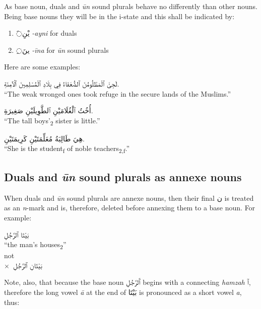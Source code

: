 \documentclass[
  10pt,
]{book}
\providecommand{\tightlist}{%
  \setlength{\itemsep}{0pt}\setlength{\parskip}{0pt}}
\begin{document}
As base noun, duals and \emph{ūn} sound plurals behave no differently than other nouns. Being base nouns they will be in the i-state and this shall be indicated by:

\begin{enumerate}
\def\labelenumi{\roman{enumi}.}
\tightlist
\item
  \foreignlanguage{arabic}{◌َيْنِ} \emph{-ayni} for duals
\item
  \foreignlanguage{arabic}{◌ِينَ} \emph{-īna} for \emph{ūn} sound plurals
\end{enumerate}

Here are some examples:

\foreignlanguage{arabic}{لَجِئَ ٱلْمَظْلُومُنَ ٱلضُّعَفَاءُ فِي بِلَادِ ٱلْمُسْلِمِينَ ٱلْآمِنَةِ.}\\
\enquote{The weak wronged ones took refuge in the secure lands of the Muslims.}

\foreignlanguage{arabic}{أُخُتُ ٱلْغُلَامَيْنِ ٱلطَّوِيلَيْنِ صَغِيرَةِ.}\\
\enquote{The tall boys'\textsubscript{2} sister is little.}

\foreignlanguage{arabic}{هِيَ طَالِبَةُ مُعَلِّمَتَيْنِ کَرِيمَتَيْنِ.}\\
\enquote{She is the student\textsubscript{f} of noble teachers\textsubscript{2,f}.}

\subsection{\texorpdfstring{Duals and \emph{ūn} sound plurals as annexe nouns}{Duals and ūn sound plurals as annexe nouns}}\label{duals-and-un-sound-plurals-as-annexe-nouns}

When duals and \emph{ūn} sound plurals are annexe nouns, then their final \foreignlanguage{arabic}{ن} is treated as an \emph{n}-mark and is, therefore, deleted before annexing them to a base noun. For example:

\foreignlanguage{arabic}{بَيْتَا ٱلرَّجُلِ}\\
\enquote{the man's houses\textsubscript{2}}\\
not\\
\(\times\)~\foreignlanguage{arabic}{بَيْتَانِ ٱلرَّجُلِ}

Note, also, that because the base noun \foreignlanguage{arabic}{ٱَلرَّجُلِ} begins with a connecting \emph{hamzah} \foreignlanguage{arabic}{ٱ}, therefore the long vowel \emph{ā} at the end of \foreignlanguage{arabic}{بَيْتَا} is pronounced as a short vowel \emph{a}, thus:
\end{document}
